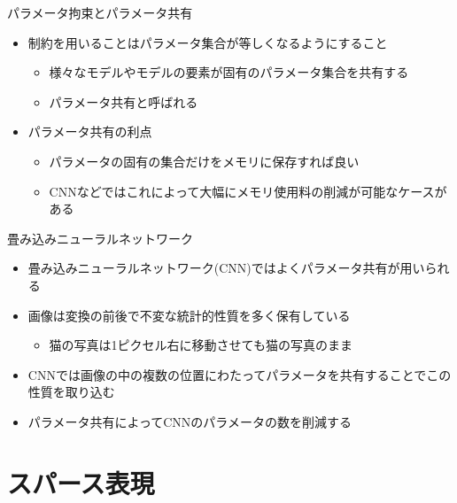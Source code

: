 \documentclass[dvipdfmx, 10pt]{beamer}
\begin{document}

\begin{frame}{パラメータ拘束とパラメータ共有}
  \begin{itemize}
    \item 制約を用いることは\alert{パラメータ集合が等しくなるようにする}こと
      \begin{itemize}
        \item 様々なモデルやモデルの要素が固有のパラメータ集合を共有する
        \item \alert{パラメータ共有}と呼ばれる
      \end{itemize}
      \item パラメータ共有の利点
      \begin{itemize}
        \item パラメータの固有の集合だけをメモリに保存すれば良い
        \item CNNなどではこれによって大幅にメモリ使用料の削減が可能なケースがある
      \end{itemize}
  \end{itemize}
\end{frame}


\begin{frame}{畳み込みニューラルネットワーク}
  \begin{itemize}
    \item \alert{畳み込みニューラルネットワーク(CNN)}ではよくパラメータ共有が用いられる
    \item 画像は変換の前後で不変な統計的性質を多く保有している
    \begin{itemize}
      \item 猫の写真は1ピクセル右に移動させても猫の写真のまま
    \end{itemize}
    \item CNNでは画像の中の複数の位置にわたってパラメータを共有することでこの性質を取り込む
    \item パラメータ共有によってCNNのパラメータの数を削減する
  \end{itemize}
\end{frame}


\section{スパース表現}

\end{document}
